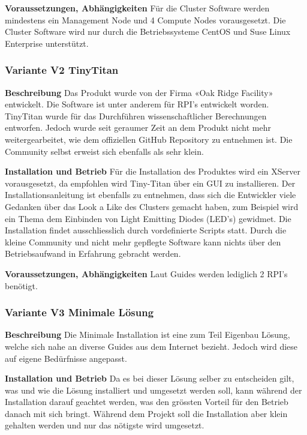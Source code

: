 \textbf{Voraussetzungen, Abhängigkeiten}\newline
Für die Cluster Software werden mindestens ein Management Node und 4 Compute Nodes vorausgesetzt. Die Cluster Software wird nur durch die Betriebssysteme CentOS und Suse Linux Enterprise unterstützt. 

\subsubsection{Variante V2 \flqq TinyTitan\frqq}
\textbf{Beschreibung}\newline
Das Produkt wurde von der Firma «Oak Ridge Facility» entwickelt. Die Software ist unter anderem für RPI’s entwickelt worden. TinyTitan wurde für das Durchführen wissenschaftlicher Berechnungen entworfen. Jedoch wurde seit geraumer Zeit an dem Produkt nicht mehr weitergearbeitet, wie dem offiziellen GitHub Repository zu entnehmen ist. Die Community selbst erweist sich ebenfalls als sehr klein. 

\textbf{Installation und Betrieb}\newline
Für die Installation des Produktes wird ein XServer vorausgesetzt, da empfohlen wird Tiny-Titan über ein GUI zu installieren. Der Installationsanleitung ist ebenfalls zu entnehmen, dass sich die Entwickler viele Gedanken über das Look a Like des Clusters gemacht haben, zum Beispiel wird ein Thema dem Einbinden von Light Emitting Diodes (LED’s) gewidmet. Die Installation findet ausschliesslich durch vordefinierte Scripts statt. Durch die kleine Community und nicht mehr gepflegte Software kann nichts über den Betriebsaufwand in Erfahrung gebracht werden.

\textbf{Voraussetzungen, Abhängigkeiten}\newline
Laut Guides werden lediglich 2 RPI’s benötigt.

\subsubsection{Variante V3 \flqq Minimale Lösung\frqq}
\textbf{Beschreibung}\newline
Die Minimale Installation ist eine zum Teil Eigenbau Lösung, welche sich nahe an diverse Guides aus dem Internet bezieht. Jedoch wird diese auf eigene Bedürfnisse angepasst.

\textbf{Installation und Betrieb}\newline
Da es bei dieser Lösung selber zu entscheiden gilt, was und wie die Lösung installiert und umgesetzt werden soll, kann während der Installation darauf geachtet werden, was den grössten Vorteil für den Betrieb danach mit sich bringt. Während dem Projekt soll die Installation aber klein gehalten werden und nur das nötigste wird umgesetzt. 

